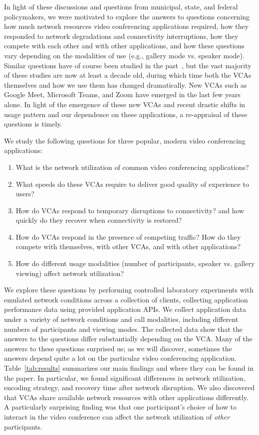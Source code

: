 In light of these discussions and questions from municipal, state, and federal
policymakers, we were motivated to explore the answers to questions concerning
how much network resources video conferencing applications required, how they
responded to network degradations and connectivity interruptions, how they
compete with each other and with other applications, and how these questions
vary depending on the modalities of use (e.g., gallery mode vs. speaker mode).
Similar questions have of course been studied in the
past~\cite{guha2005experimental, baset2004analysis, bonfiglio2008detailed,
bonfiglio2008tracking, xu2012video}, but the vast majority of these studies
are now at least a decade old, during which time both the VCAs themselves and
how we use them has changed dramatically. New VCAs such as Google Meet,
Microsoft Teams, and Zoom have emerged in the last few years alone. In light
of the emergence of these new VCAs and recent drastic shifts in usage pattern
and our dependence on these applications, a re-appraisal of these questions is
timely.

We study the following questions for three popular, modern video conferencing
applications:
\begin{enumerate}[noitemsep]
    \item What is the network utilization of common video conferencing
        applications?
    \item What speeds do these VCAs require to deliver good quality of
        experience to users?
    \item How do VCAs respond to temporary disruptions to connectivity?
        and how quickly do they recover when connectivity is restored?
    \item How do VCAs respond in the presence of competing traffic? How do
        they compete with themselves, with other VCAs, and with other
        applications?
    \item How do different usage modalities (number of participants, speaker
        vs. gallery viewing) affect network utilization?
\end{enumerate}
\noindent
We explore these questions by performing controlled laboratory experiments
with emulated network conditions across a collection of clients, collecting
application performance data using provided application APIs. We collect
application data under a variety of network conditions and call modalities,
including different numbers of participants and viewing modes. 
The collected data show that the answers to
the questions differ substantially depending on the VCA. Many of the answers
to these questions surprised us; as we will discover,
sometimes the answers depend quite a lot on the particular video
conferencing application. Table~\ref{tab:results} summarizes our main findings
and where they can be found in the paper. In particular, we found significant
differences in network utilization, encoding strategy, and recovery time after
network disruption. We also discovered that VCAs share available network
resources with other applications differently. A particularly surprising
finding was that one participant's
choice of how to interact in the video conference can affect the network
utilization of {\em other} participants.

